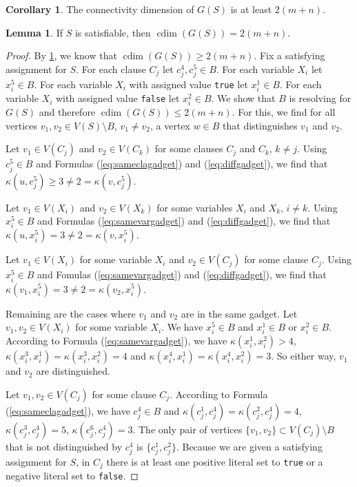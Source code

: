 \documentclass[letterpaper,12pt,headings=normal,parskip=half]{scrartcl}
\DeclareMathOperator{\cdim}{cdim}
\theoremstyle{definition}
\newtheorem{lemma}[theorem]{Lemma}
\newtheorem{corollary}[theorem]{Corollary}
\begin{document}
\begin{corollary}\label{cdimatleast2mn}
    The connectivity dimension of $G(S)$ is at least $2(m+n)$.    
\end{corollary}

\begin{lemma}\label{cdimequal2mn}
    If $S$ is satisfiable, then $\cdim(G(S))=2(m+n)$.
\end{lemma}

\begin{proof}
    By \cref{cdimatleast2mn}, we know that $\cdim(G(S))\geq2(m+n)$.
    Fix a satisfying assignment for $S$. 
    For each clause $C_j$ let $c_j^4,c_j^5\in B$. 
    For each variable $X_i$ let $x_i^5\in B$.
    For each variable $X_i$ with assigned value \texttt{true} let $x_i^1\in B$.
    For each variable $X_i$ with assigned value \texttt{false} let $x_i^2\in B$.
    We show that $B$ is resolving for $G(S)$ and therefore $\cdim(G(S))\leq2(m+n)$. For this, we find for all vertices $v_1,v_2\in V(S)\setminus B$, $v_1\neq v_2$, a vertex $w\in B$ that distinguishes $v_1$ and $v_2$.
    
    Let $v_1\in V(C_j)$ and $v_2\in V(C_k)$ for some clauses $C_j$ and $C_k$, $k\neq j$.
    Using $c_j^5\in B$ and Formulas (\ref{eq:sameclagadget}) and (\ref{eq:diffgadget}), we find that $\kappa(u,c_j^5)\geq3 \neq 2=\kappa(v,c_j^5)$.

    Let $v_1\in V(X_i)$ and $v_2\in V(X_k)$ for some variables $X_i$ and $X_k$, $i\neq k$.
    Using $x_i^5\in B$ and Formulas (\ref{eq:samevargadget}) and (\ref{eq:diffgadget}), we find that $\kappa(u,x_i^5)=3\neq2=\kappa(v,x_i^5)$.

    Let $v_1\in V(X_i)$ for some variable $X_i$ and $v_2\in V(C_j)$ for some clause $C_j$. 
    Using $x_i^5\in B$ and Fomulas (\ref{eq:samevargadget}) and (\ref{eq:diffgadget}), we find that $\kappa(v_1,x_i^5)=3\neq2=\kappa(v_2,x_i^5)$.
    
    Remaining are the cases where $v_1$ and $v_2$ are in the same gadget. 
    Let $v_1,v_2\in V(X_i)$ for some variable $X_i$. 
    We have $x_i^5\in B$ and $x_i^1\in B$ or $x_i^2\in B$. 
    According to Formula (\ref{eq:samevargadget}), we have $\kappa(x_i^1,x_i^2)>4$, $\kappa(x_i^3,x_i^1)=\kappa(x_i^3,x_i^2)=4$ and $\kappa(x_i^4,x_i^1)=\kappa(x_i^4,x_i^2)=3$. 
    So either way, $v_1$ and $v_2$ are distinguished.
    
    Let $v_1,v_2\in V(C_j)$ for some clause $C_j$. 
    According to Formula (\ref{eq:sameclagadget}), we have $c_j^4\in B$ and $\kappa(c_j^1,c_j^4)=\kappa(c_j^2,c_j^4)=4$, $\kappa(c_j^3,c_j^4)=5$, $\kappa(c_j^6,c_j^4)=3$.
    The only pair of vertices $\{v_1,v_2\}\subset V(C_j)\setminus B$ that is not distinguished by $c_j^4$ is $\{c_j^1,c_j^2\}$. 
    Because we are given a satisfying assignment for $S$, in $C_j$ there is at least one positive literal set to \texttt{true} or a negative literal set to \texttt{false}.
    

\end{proof}
\end{document}
